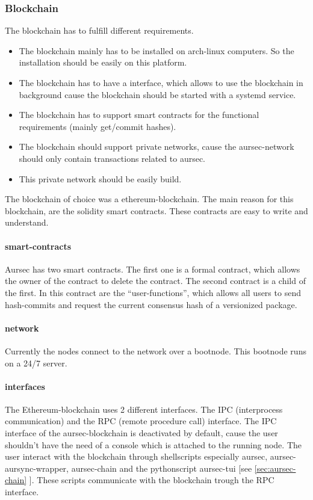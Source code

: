 \subsubsection{Blockchain} \label{sec:blockchain}
The blockchain has to fulfill different requirements.
\begin{itemize}
	\item The blockchain mainly has to be installed on arch-linux computers. So the installation should be easily on this platform.
	\item The blockchain has to have a interface, which allows to use the blockchain in background cause the blockchain should be started with a systemd service.
	\item The blockchain has to support smart contracts for the functional requirements (mainly get/commit hashes).
	\item The blockchain should support private networks, cause the aursec-network should only contain transactions related to aursec.
	\item This private network should be easily build.
\end{itemize}

The blockchain of choice was a ethereum-blockchain. The main reason for this blockchain, are the solidity smart contracts. These contracts are easy to write and understand. 

\paragraph*{smart-contracts}
Aursec has two smart contracts. The first one is a formal contract, which allows the owner of the contract to delete the contract. The second contract is a child of the first. In this contract are the ``user-functions'', which allows all users to send hash-commits and request the current consensus hash of a versionized package. 

\paragraph*{network}
Currently the nodes connect to the network over a bootnode. This bootnode runs on a 24/7 server.

\paragraph*{interfaces}
The Ethereum-blockchain uses 2 different interfaces. The IPC (interprocess communication) and the RPC (remote procedure call) interface. The IPC interface of the aursec-blockchain is deactivated by default, cause the user shouldn't have the need of a console which is attached to the running node. The user interact with the blockchain through shellscripts especially aursec, aursec-aursync-wrapper, aursec-chain and the pythonscript aursec-tui [see \ref{sec:aursec-chain} ]. These scripts communicate with the blockchain trough the RPC interface. 